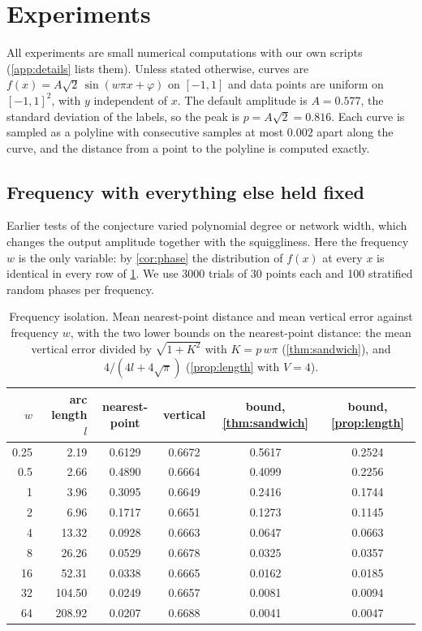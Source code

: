 \section{Experiments}
\label{sec:experiments}

All experiments are small numerical computations with our own scripts
(\cref{app:details} lists them). Unless stated otherwise, curves are
$f(x)=A\sqrt2\,\sin(w\pi x+\varphi)$ on $[-1,1]$ and data points are uniform on
$[-1,1]^2$, with $y$ independent of $x$. The default amplitude is $A=0.577$, the
standard deviation of the labels, so the peak is $p=A\sqrt2=0.816$. Each curve
is sampled as a polyline with consecutive samples at most $0.002$ apart along
the curve, and the distance from a point to the polyline is computed exactly.

\subsection{Frequency with everything else held fixed}
\label{sec:freq}

Earlier tests of the conjecture varied polynomial degree or network width, which
changes the output amplitude together with the squiggliness. Here the frequency
$w$ is the only variable: by \cref{cor:phase} the distribution of $f(x)$ at
every $x$ is identical in every row of \cref{tab:freq}. We use 3000 trials of
30 points each and 100 stratified random phases per frequency.

\begin{table}[t]
  \caption{Frequency isolation. Mean nearest-point distance and mean vertical
  error against frequency $w$, with the two lower bounds on the nearest-point
  distance: the mean vertical error divided by $\sqrt{1+K^2}$ with $K=p\,w\pi$
  (\cref{thm:sandwich}), and $4/(4l+4\sqrt\pi)$ (\cref{prop:length} with $V=4$).}
  \label{tab:freq}
  \centering
  \begin{tabular}{rrcccc}
    \toprule
    $w$ & arc length $l$ & nearest-point & vertical & bound, \cref{thm:sandwich} & bound, \cref{prop:length} \\
    \midrule
    0.25 &   2.19 & 0.6129 & 0.6672 & 0.5617 & 0.2524 \\
    0.5  &   2.66 & 0.4890 & 0.6664 & 0.4099 & 0.2256 \\
    1    &   3.96 & 0.3095 & 0.6649 & 0.2416 & 0.1744 \\
    2    &   6.96 & 0.1717 & 0.6651 & 0.1273 & 0.1145 \\
    4    &  13.32 & 0.0928 & 0.6663 & 0.0647 & 0.0663 \\
    8    &  26.26 & 0.0529 & 0.6678 & 0.0325 & 0.0357 \\
    16   &  52.31 & 0.0338 & 0.6665 & 0.0162 & 0.0185 \\
    32   & 104.50 & 0.0249 & 0.6657 & 0.0081 & 0.0094 \\
    64   & 208.92 & 0.0207 & 0.6688 & 0.0041 & 0.0047 \\
    \bottomrule
  \end{tabular}
\end{table}

